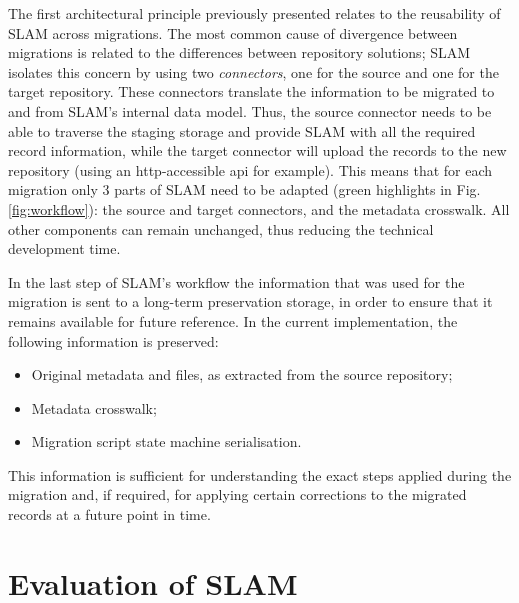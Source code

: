 The first architectural principle previously presented relates to the reusability of SLAM across migrations. The most common cause of divergence between migrations is related to the differences between repository solutions; SLAM isolates this concern by using two \emph{connectors}, one for the source and one for the target repository. These connectors translate the information to be migrated to and from SLAM's internal data model. Thus, the source connector needs to be able to traverse the staging storage and provide SLAM with all the required record information, while the target connector will upload the records to the new repository (using an \gls{http}-accessible \gls{api} for example). This means that for each migration only 3 parts of SLAM need to be adapted (green highlights in Fig. \ref{fig:workflow}): the source and target connectors, and the metadata crosswalk. All other components can remain unchanged, thus reducing the technical development time.

In the last step of SLAM's workflow the information that was used for the migration is sent to a long-term preservation storage, in order to ensure that it remains available for future reference. In the current implementation, the following information is preserved:
\begin{itemize}
    \item Original metadata and files, as extracted from the source repository;
    \item Metadata crosswalk;
    \item Migration script state machine serialisation.
\end{itemize}
This information is sufficient for understanding the exact steps applied during the migration and, if required, for applying certain corrections to the migrated records at a future point in time.


\section{Evaluation of SLAM}
\label{sec:eval}

